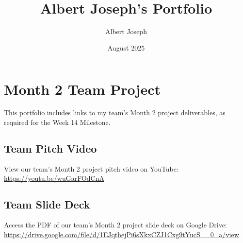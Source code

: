\documentclass[a4paper,12pt]{article}
\begin{document}
   \title{Albert Joseph's Portfolio}
   \author{Albert Joseph}
   \date{August 2025}
   \maketitle

   \section*{Month 2 Team Project}
   This portfolio includes links to my team's Month 2 project deliverables, as required for the Week 14 Milestone.

   \subsection*{Team Pitch Video}
   View our team's Month 2 project pitch video on YouTube: \\
   \href{https://youtu.be/wuGarFOdCnA?si=fUgXHwErNdA0dVk7}{https://youtu.be/wuGarFOdCnA}

   \subsection*{Team Slide Deck}
   Access the PDF of our team's Month 2 project slide deck on Google Drive: \\
   \href{https://drive.google.com/file/d/1EJqthejPi6sXkxCZJ1Cxg9tYucS__0_a/view?usp=sharing}{https://drive.google.com/file/d/1EJqthejPi6sXkxCZJ1Cxg9tYucS__0_a/view}

   
\end{document}
